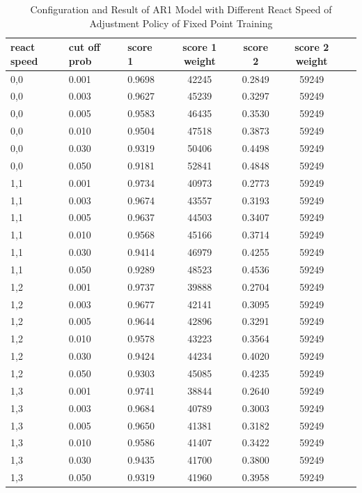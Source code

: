 \documentclass{article}
\begin{document}
\begin{longtable}[htbp]{l|l|l|*{4}{c}}
    \caption{Configuration and Result of AR1 Model with Different React Speed of Adjustment Policy of Fixed Point Training}
    \label{tab:tab1.8.2} \\
    \textbf{react speed} & \textbf{cut off prob} & \textbf{score 1} &
    \textbf{score 1 weight} & \textbf{score 2} & \textbf{score 2 weight} \\
    \hline
    0,0 & 0.001 & 0.9698 & 42245 & 0.2849 & 59249\\
    0,0 & 0.003 & 0.9627 & 45239 & 0.3297 & 59249\\
    0,0 & 0.005 & 0.9583 & 46435 & 0.3530 & 59249\\
    0,0 & 0.010 & 0.9504 & 47518 & 0.3873 & 59249\\
    0,0 & 0.030 & 0.9319 & 50406 & 0.4498 & 59249\\
    0,0 & 0.050 & 0.9181 & 52841 & 0.4848 & 59249\\
    1,1 & 0.001 & 0.9734 & 40973 & 0.2773 & 59249\\
    1,1 & 0.003 & 0.9674 & 43557 & 0.3193 & 59249\\
    1,1 & 0.005 & 0.9637 & 44503 & 0.3407 & 59249\\
    1,1 & 0.010 & 0.9568 & 45166 & 0.3714 & 59249\\
    1,1 & 0.030 & 0.9414 & 46979 & 0.4255 & 59249\\
    1,1 & 0.050 & 0.9289 & 48523 & 0.4536 & 59249\\
    1,2 & 0.001 & 0.9737 & 39888 & 0.2704 & 59249\\
    1,2 & 0.003 & 0.9677 & 42141 & 0.3095 & 59249\\
    1,2 & 0.005 & 0.9644 & 42896 & 0.3291 & 59249\\
    1,2 & 0.010 & 0.9578 & 43223 & 0.3564 & 59249\\
    1,2 & 0.030 & 0.9424 & 44234 & 0.4020 & 59249\\
    1,2 & 0.050 & 0.9303 & 45085 & 0.4235 & 59249\\
    1,3 & 0.001 & 0.9741 & 38844 & 0.2640 & 59249\\
    1,3 & 0.003 & 0.9684 & 40789 & 0.3003 & 59249\\
    1,3 & 0.005 & 0.9650 & 41381 & 0.3182 & 59249\\
    1,3 & 0.010 & 0.9586 & 41407 & 0.3422 & 59249\\
    1,3 & 0.030 & 0.9435 & 41700 & 0.3800 & 59249\\
    1,3 & 0.050 & 0.9319 & 41960 & 0.3958 & 59249\\

\end{longtable}
\end{document}
